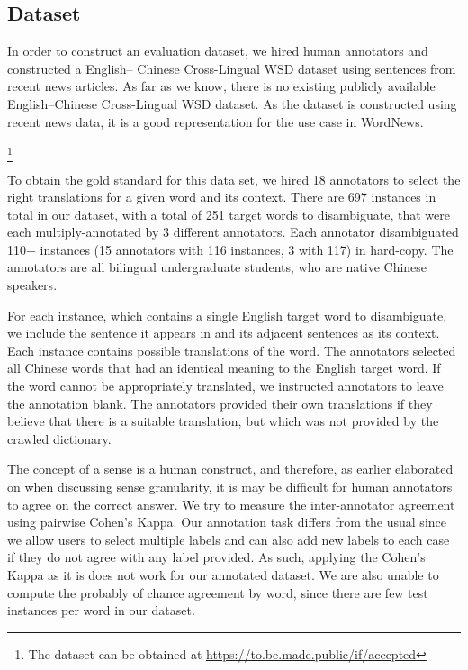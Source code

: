 \subsection{Dataset}
In order to construct an evaluation dataset, we hired human annotators and constructed a English--
Chinese Cross-Lingual WSD dataset using sentences from recent news articles. As far as we know, there 
is no existing publicly available English--Chinese Cross-Lingual WSD dataset. As the dataset is 
constructed using recent news data, it is a good representation for the use case in WordNews.{\footnote{The dataset can be obtained at %
{\url{https://to.be.made.public/if/accepted}}}

To obtain the gold standard for this data set, we hired 18 annotators to select the right translations for a given word and its context. There are 697 instances in total in our dataset, with a total of 251 target words to disambiguate, that were each multiply-annotated by 3 different annotators. Each annotator disambiguated 110+ instances (15 annotators with 116 instances, 3 with 117) in hard-copy. The annotators are all bilingual undergraduate students, who are native Chinese speakers. 

For each instance, which contains a single English target word to disambiguate, we include the sentence it appears in and its adjacent sentences as its context. Each instance contains possible translations of the word. 
The annotators selected all Chinese words that had an identical meaning to the English target word. If the word cannot be appropriately translated, we instructed annotators to leave the annotation blank. The annotators provided their own translations if they believe that there is a suitable translation, but which was not provided by the crawled dictionary. 

The concept of a sense is a human construct, and therefore, as earlier elaborated on when discussing sense granularity, it is %
may be difficult for human annotators to agree on the correct answer. We try to measure the inter-annotator agreement using pairwise Cohen's Kappa. Our annotation task differs from the usual since we allow users to select multiple labels and can also add new labels to each case if they do not agree with any label provided. As such, applying the Cohen's Kappa as it is does not work for our annotated dataset. %
We are also unable to compute the probably of chance agreement by word, since there are few test instances per word in our dataset.

}
